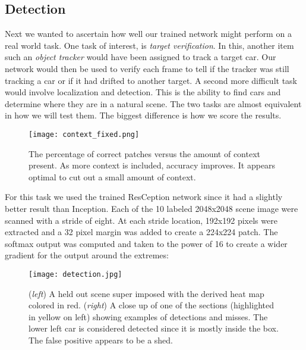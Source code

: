 \documentclass[runningheads]{llncs}
\begin{document}
\subsection{Detection}
Next we wanted to ascertain how well our trained network might perform on a real world task. One task of interest, is {\it target verification}. In this, another item such an {\it object tracker} \cite{Wu13} would have been assigned to track a target car. Our network would then be used to verify each frame to tell if the tracker was still tracking a car or if it had drifted to another target. A second more difficult task would involve localization and detection. This is the ability to find cars and determine where they are in a natural scene. The two tasks are almost equivalent in how we will test them. The biggest difference is how we score the results. 

\begin{figure}
\centering
\texttt{[image: context\_fixed.png]}
\caption{The percentage of correct patches versus the amount of context present. As more context is included, accuracy improves. It appears optimal to cut out a small amount of context. }
\label{fig:context}
\end{figure}

For this task we used the trained ResCeption network since it had a slightly better result than Inception. Each of the 10 labeled 2048x2048 scene image were scanned with a stride of eight. At each stride location, 192x192 pixels were extracted and a 32 pixel margin was added to create a 224x224 patch. The softmax output was computed and taken to the power of 16 to create a wider gradient for the output around the extremes:


\begin{figure}
\centering
\texttt{[image: detection.jpg]}
\caption{ ({\it left}) A held out scene super imposed with the derived heat map colored in red. ({\it right}) A close up of one of the sections (highlighted in yellow on left) showing examples of detections and misses. The lower left car is considered detected since it is mostly inside the box. The false positive appears to be a shed. }
\label{fig:detections}
\end{figure}
\end{document}
